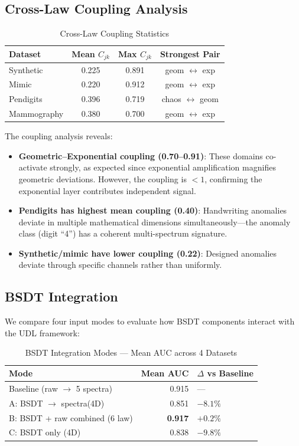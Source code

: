 \documentclass[journal]{IEEEtran}
\begin{document}
\subsection{Cross-Law Coupling Analysis}
\label{ssec:coupling_results}

\begin{table}[h]
\centering
\caption{Cross-Law Coupling Statistics}
\label{tab:coupling}
\begin{tabular}{@{}lccc@{}}
\toprule
\textbf{Dataset} & \textbf{Mean $C_{jk}$} & \textbf{Max $C_{jk}$} & \textbf{Strongest Pair} \\
\midrule
Synthetic & 0.225 & 0.891 & geom $\leftrightarrow$ exp \\
Mimic & 0.220 & 0.912 & geom $\leftrightarrow$ exp \\
Pendigits & 0.396 & 0.719 & chaos $\leftrightarrow$ geom \\
Mammography & 0.380 & 0.700 & geom $\leftrightarrow$ exp \\
\bottomrule
\end{tabular}
\end{table}

The coupling analysis reveals:
\begin{itemize}
  \item \textbf{Geometric--Exponential coupling (0.70--0.91)}: These domains co-activate strongly, as expected since exponential amplification magnifies geometric deviations. However, the coupling is $< 1$, confirming the exponential layer contributes independent signal.
  \item \textbf{Pendigits has highest mean coupling (0.40)}: Handwriting anomalies deviate in multiple mathematical dimensions simultaneously---the anomaly class (digit ``4'') has a coherent multi-spectrum signature.
  \item \textbf{Synthetic/mimic have lower coupling (0.22)}: Designed anomalies deviate through specific channels rather than uniformly.
\end{itemize}

\subsection{BSDT Integration}
\label{ssec:bsdt_integration}

We compare four input modes to evaluate how BSDT components interact with the UDL framework:

\begin{table}[h]
\centering
\caption{BSDT Integration Modes --- Mean AUC across 4 Datasets}
\label{tab:modes}
\begin{tabular}{@{}lrl@{}}
\toprule
\textbf{Mode} & \textbf{Mean AUC} & \textbf{$\Delta$ vs Baseline} \\
\midrule
Baseline (raw $\to$ 5 spectra) & 0.915 & --- \\
A: BSDT $\to$ spectra(4D) & 0.851 & $-8.1\%$ \\
B: BSDT + raw combined (6 law) & \textbf{0.917} & $+0.2\%$ \\
C: BSDT only (4D) & 0.838 & $-9.8\%$ \\
\bottomrule
\end{tabular}
\end{table}
\end{document}
